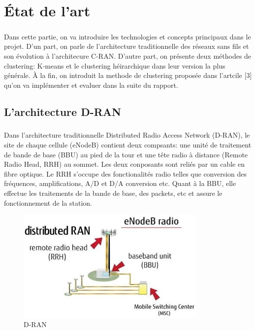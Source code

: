 \documentclass{report}
\begin{document}
\newpage
\chapter{État de l'art}
\paragraph{}
  Dans cette partie, on va introduire les technologies et concepts principaux dans le projet. D'un part, on parle de l'architecture traditionnelle
  des réseaux sans fils et son évolution à l'architecure C-RAN. D'autre part, on présente deux méthodes de clustering: 
  K-means et le clustering héirarchique dans leur version la plus générale. À la fin, on introduit la methode de clustering proposée dans l'artcile [3]
  qu'on va implémenter et evaluer dans la suite du rapport. 
\section{L'architecture D-RAN}
\paragraph{}
Dans l'architecture traditionnelle Distributed Radio Access Network (D-RAN), le site de chaque cellule (eNodeB) contient deux compsants:
une unité de traitement de bande de base (BBU) au pied de la tour et une tête radio à distance (Remote Radio Head, RRH) au sommet. 
Les deux conposants sont reliés par un cable en fibre optique. Le RRH s’occupe des fonctionalités radio telles que conversion des 
fréquences, amplifications, A/D et D/A conversion etc. Quant à la BBU, elle effectue les traitements de la bande de base, des packets, etc et assure le fonctionnement de la station. 
\begin{figure}[h]
  \centering
  \includegraphics[width=25em]{images/D-RAN.jpg} 
  \caption{D-RAN}
\end{figure}
\end{document}
